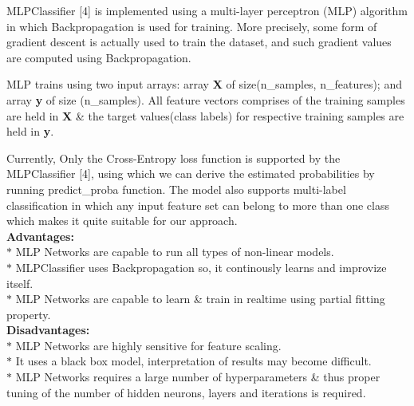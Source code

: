 \documentclass[a4paper, 10pt, conference]{IEEEtran}
\begin{document}
MLPClassifier [4] is implemented using a multi-layer perceptron (MLP) algorithm in which Backpropagation is used for training. More precisely, some form of gradient descent is actually used to train the dataset, and such gradient values are computed using Backpropagation.

MLP trains using two input arrays: array \textbf{X} of size(n\_samples, n\_features); and array \textbf{y} of size (n\_samples). All feature vectors comprises of the training samples are held in \textbf{X} \& the target values(class labels) for respective training samples are held in \textbf{y}.

Currently, Only the Cross-Entropy loss function is supported by the MLPClassifier [4], using which we can derive the estimated probabilities by running predict\_proba function. The model also supports multi-label classification in which any input feature set can belong to more than one class which makes it quite suitable for our approach. \\

\textbf{Advantages:}\\
\indent $\ast$ MLP Networks are capable to run all types of non-linear models.\\
\indent $\ast$ MLPClassifier uses Backpropagation so, it continously learns and improvize itself.\\
\indent $\ast$ MLP Networks are capable to learn \& train in real\-time using partial fitting property.\\

\textbf{Disadvantages:}\\
\indent $\ast$ MLP Networks are highly sensitive for feature scaling.\\
\indent $\ast$ It uses a black box model, interpretation of results may become difficult.\\
\indent $\ast$ MLP Networks requires a large number of hyperparameters \& thus proper tuning of the number of hidden neurons, layers and iterations is required.
\end{document}
